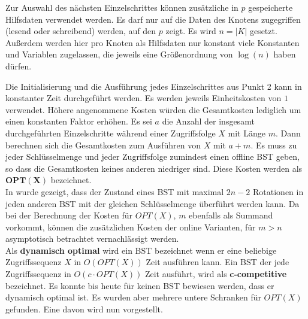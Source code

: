 \documentclass[a4paper,12pt]{article}
\begin{document}
 
 \noindent 	Zur Auswahl des nächsten Einzelschrittes können zusätzliche in $p$ gespeicherte Hilfsdaten verwendet werden. Es darf nur auf die Daten des Knotens zugegriffen (lesend oder schreibend) werden, auf den $p$ zeigt. Es wird $n = \vert K \vert$ gesetzt. Außerdem werden hier pro Knoten als Hilfsdaten nur konstant viele Konstanten und Variablen zugelassen, die jeweils eine Größenordnung von $\log \left(n\right)$  haben dürfen.
 
 \noindent Die Initialisierung und die Ausführung jedes Einzelschrittes aus Punkt 2 kann in konstanter Zeit durchgeführt werden. Es werden jeweils Einheitskosten von $1$ verwendet. Höhere angenommene Kosten würden die Gesamtkosten lediglich um einen konstanten Faktor erhöhen. Es sei $a$ die Anzahl der insgesamt durchgeführten Einzelschritte während einer Zugriffsfolge $X$ mit Länge $m$. Dann berechnen sich die Gesamtkosten zum Ausführen von $X$ mit $a + m$. Es muss zu jeder Schlüsselmenge und jeder Zugriffsfolge zumindest einen offline BST geben, so dass die Gesamtkosten keines anderen niedriger sind. Diese Kosten werden als $\mathbf{OPT\left(X\right)}$ bezeichnet.\\  In \cite{nRotations} wurde gezeigt, dass der Zustand eines BST mit maximal $2n -2$ Rotationen in jeden anderen BST mit der gleichen Schlüsselmenge überführt werden kann. Da bei der Berechnung der Kosten für  $\mathit{OPT(X)}$, $m$ ebenfalls als Summand vorkommt, können die zusätzlichen Kosten der online Varianten, für $m > n$ asymptotisch betrachtet vernachlässigt werden. \\
 \noindent Als \textbf{dynamisch optimal } wird ein BST bezeichnet wenn er eine beliebige Zugriffssequenz $X$ in $O\left(\mathit{OPT}\left(X\right)\right)$ Zeit ausführen kann. Ein BST der jede Zugriffssequenz in $O\left(c \cdot \mathit{OPT}\left(X\right)\right)$ Zeit ausführt, wird als \textbf{c-competitive} bezeichnet. Es konnte bis heute für keinen BST bewiesen werden, dass er dynamisch optimal ist. Es wurden aber mehrere untere Schranken für $\mathit{OPT}\left(X\right)$ gefunden. Eine davon wird  nun vorgestellt.
\end{document}
